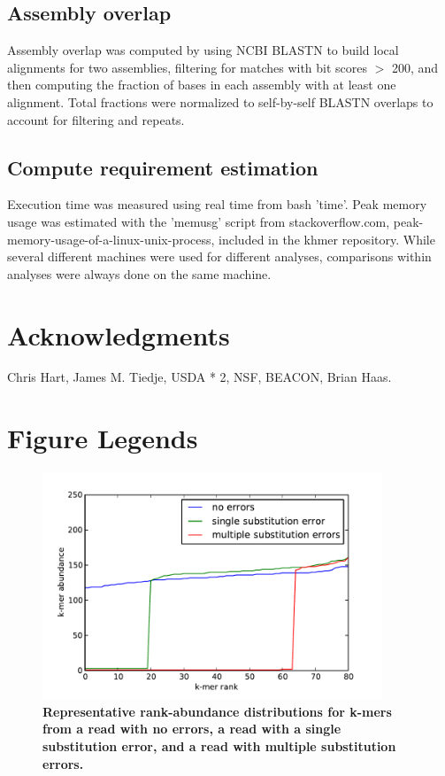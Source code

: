\documentclass[10pt]{article}
\begin{document}
\subsection*{Assembly overlap}

Assembly overlap was computed by using NCBI BLASTN to build local
alignments for two assemblies, filtering for matches with bit scores
$>$ 200, and then computing the fraction of bases in each assembly
with at least one alignment.  Total fractions were normalized to
self-by-self BLASTN overlaps to account for filtering and repeats.

\subsection*{Compute requirement estimation}

Execution time was measured using real time from bash 'time'.  Peak
memory usage was estimated with the 'memusg' script from
stackoverflow.com, peak-memory-usage-of-a-linux-unix-process, included
in the khmer repository.  While several different machines were used
for different analyses, comparisons within analyses were always done
on the same machine.

\section*{Acknowledgments}

Chris Hart, James M. Tiedje, USDA * 2, NSF, BEACON, Brian Haas.



\newpage

\section*{Figure Legends}

\begin{figure}
\centerline{\includegraphics[width=4in]{diginorm-ranks.pdf}}
\caption{
{\bf Representative rank-abundance distributions for k-mers from a read with no errors,
a read with a single substitution error, and a read with multiple
substitution errors.}}
\label{fig:rankabund}
\end{figure}
\end{document}
